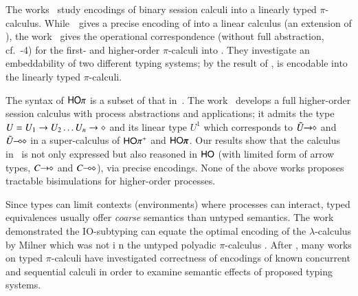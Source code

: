 
The works~\cite{DemangeonH11,Dardha:2012:STR:2370776.2370794} 
study encodings of binary session calculi into a linearly typed $\pi$-calculus. 
While~\cite{DemangeonH11}~gives a precise encoding of \sessp into a linear calculus 
(an extension of \cite{BHY}),  
the work~\cite{Dardha:2012:STR:2370776.2370794} 
gives the operational correspondence 
(without full abstraction, cf.~-4)
for the first- and higher-order 
$\pi$-calculi into \cite{LinearPi}. 
They investigate an embeddability of two different typing systems;
by the result of \cite{DemangeonH11}, 
\HOpp is encodable  into the linearly typed $\pi$-calculi.     

The syntax of $\mathsf{HO}\pi$ is a subset of that in~\cite{tlca07,MostrousY15}.
The work~\cite{tlca07} develops a full higher-order session calculus
with process abstractions and applications; it admits the type 
$U=U_1 \rightarrow U_2 \dots U_n \rightarrow \diamond$ and its linear type 
$U^1$
which corresponds to $\tilde{U}\!\! \rightarrow\!\! \diamond$ and $\tilde{U}\!\! \multimap\!\! \diamond$ in 
a super-calculus of $\mathsf{HO}\pi^{\mathsf +}$ and $\PHOp$. 
Our results show that
the calculus in~\cite{tlca07} is not only expressed but 
also reasoned in 
$\mathsf{HO}$ (with limited form of arrow types, $C\!\! \rightarrow\!\! \diamond$ and $C\!\! \multimap\!\! \diamond$), via precise encodings. 
{None of the above works proposes tractable 
bisimulations for higher-order processes.}  



Since types can limit
contexts (environments) where processes can interact, typed equivalences
usually offer {\em coarse} semantics than untyped semantics. 
The work  \cite{PiSa96b} demonstrated the IO-subtyping can equate 
the optimal encoding of the $\lambda$-calculus by Milner which was not i
n the untyped polyadic $\pi$-calculus \cite{MilnerR:funp}. 
After \cite{PiSa96b}, many works on typed $\pi$-calculi 
have investigated correctness of encodings of known concurrent and
sequential calculi in order to examine semantic
effects of proposed typing systems. 

